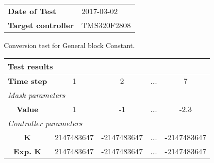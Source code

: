 \begin{tabular}{l l}
\textbf{Date of Test} & 2017-03-02 \tabularnewline
\textbf{Target controller} & TMS320F2808 \tabularnewline
\end{tabular}
\vspace{1ex}
Conversion test for General block Constant.

\vspace{1em}
\begin{tabularx}{\textwidth}{|c|c|c|>{\centering\arraybackslash}X|c|}
\hline
\multicolumn{5}{|l|}{\cellcolor[gray]{0.8}\textbf{Test results}} \tabularnewline \hline
\textbf{Time step} & 1 & 2 & ... & 7 \tabularnewline \hline
\multicolumn{5}{|l|}{\cellcolor[gray]{0.9}\textit{Mask parameters}} \tabularnewline \hline
\textbf{Value} & 1 & -1 & ... & -2.3 \tabularnewline \hline
\multicolumn{5}{|l|}{\cellcolor[gray]{0.9}\textit{Controller parameters}} \tabularnewline \hline
\textbf{K} & 2147483647 & -2147483647 & ... & -2147483647 \tabularnewline \hline
\textbf{Exp. K} & 2147483647 & -2147483647 & ... & -2147483647 \tabularnewline \hline
\end{tabularx}
\vspace{1ex}
